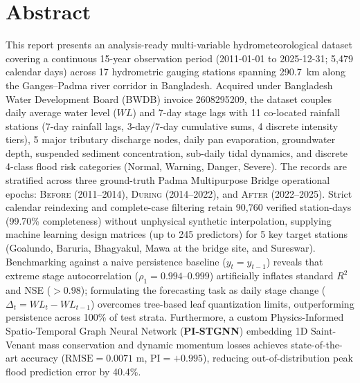 \documentclass[11pt,a4paper]{article}
\begin{document}
\section{Abstract}

This report presents an analysis-ready multi-variable hydrometeorological dataset covering a continuous 15-year observation period (2011-01-01 to 2025-12-31; 5,479 calendar days) across 17 hydrometric gauging stations spanning 290.7~km along the Ganges--Padma river corridor in Bangladesh. Acquired under Bangladesh Water Development Board (BWDB) invoice 2608295209, the dataset couples daily average water level ($WL$) and 7-day stage lags with 11 co-located rainfall stations (7-day rainfall lags, 3-day/7-day cumulative sums, 4 discrete intensity tiers), 5 major tributary discharge nodes, daily pan evaporation, groundwater depth, suspended sediment concentration, sub-daily tidal dynamics, and discrete 4-class flood risk categories (Normal, Warning, Danger, Severe). The records are stratified across three ground-truth Padma Multipurpose Bridge operational epochs: \textsc{Before} (2011--2014), \textsc{During} (2014--2022), and \textsc{After} (2022--2025). Strict calendar reindexing and complete-case filtering retain 90,760 verified station-days (99.70\% completeness) without unphysical synthetic interpolation, supplying machine learning design matrices (up to 245 predictors) for 5 key target stations (Goalundo, Baruria, Bhagyakul, Mawa at the bridge site, and Sureswar). Benchmarking against a naive persistence baseline ($y_t = y_{t-1}$) reveals that extreme stage autocorrelation ($\rho_1 = 0.994$--$0.999$) artificially inflates standard $R^2$ and NSE ($>0.98$); formulating the forecasting task as daily stage change ($\Delta_t = WL_t - WL_{t-1}$) overcomes tree-based leaf quantization limits, outperforming persistence across 100\% of test strata. Furthermore, a custom Physics-Informed Spatio-Temporal Graph Neural Network (\textbf{PI-STGNN}) embedding 1D Saint-Venant mass conservation and dynamic momentum losses achieves state-of-the-art accuracy ($\text{RMSE} = 0.0071\text{ m}$, $\text{PI} = +0.995$), reducing out-of-distribution peak flood prediction error by 40.4\%.


\end{document}
